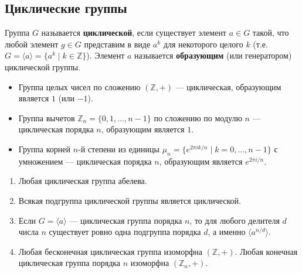\documentclass[10pt]{article}
\begin{document}
\subsection{Циклические группы}

\begin{definition}
Группа $G$ называется \textbf{циклической}, если существует элемент $a \in G$ такой, что любой элемент $g \in G$ представим в виде $a^k$ для некоторого целого $k$ (т.е. $G = \langle a \rangle = \{a^k \mid k \in \mathbb{Z}\}$). Элемент $a$ называется \textbf{образующим} (или генератором) циклической группы.
\end{definition}

\begin{example}
\begin{itemize}
    \item Группа целых чисел по сложению $(\mathbb{Z}, +)$ — циклическая, образующим является $1$ (или $-1$).
    \item Группа вычетов $\mathbb{Z}_n = \{0,1,\dots,n-1\}$ по сложению по модулю $n$ — циклическая порядка $n$, образующим является $1$.
    \item Группа корней $n$-й степени из единицы $\mu_n = \{e^{2\pi i k/n} \mid k=0,\dots,n-1\}$ с умножением — циклическая порядка $n$, образующим является $e^{2\pi i / n}$.
\end{itemize}
\end{example}

\begin{stat}
\begin{enumerate}
    \item Любая циклическая группа абелева.
    \item Всякая подгруппа циклической группы является циклической.
    \item Если $G = \langle a \rangle$ — циклическая группа порядка $n$, то для любого делителя $d$ числа $n$ существует ровно одна подгруппа порядка $d$, а именно $\langle a^{n/d} \rangle$.
    \item Любая бесконечная циклическая группа изоморфна $(\mathbb{Z}, +)$. Любая конечная циклическая группа порядка $n$ изоморфна $(\mathbb{Z}_n, +)$.
\end{enumerate}
\end{stat}
\end{document}
